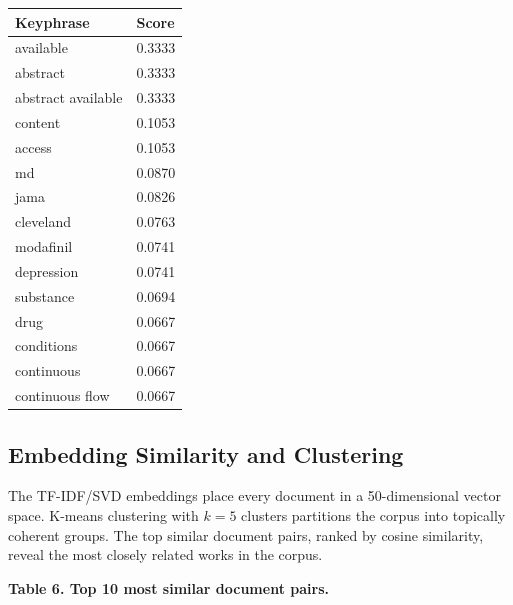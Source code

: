 \documentclass[
  english,
]{article}
\newcounter{none} %
\begin{document}
{\def\LTcaptype{none} %
\begin{longtable}[]{@{}ll@{}}
\toprule\noalign{}
Keyphrase & Score \\
\midrule\noalign{}
\endhead
\bottomrule\noalign{}
\endlastfoot
available & 0.3333 \\
abstract & 0.3333 \\
abstract available & 0.3333 \\
content & 0.1053 \\
access & 0.1053 \\
md & 0.0870 \\
jama & 0.0826 \\
cleveland & 0.0763 \\
modafinil & 0.0741 \\
depression & 0.0741 \\
substance & 0.0694 \\
drug & 0.0667 \\
conditions & 0.0667 \\
continuous & 0.0667 \\
continuous flow & 0.0667 \\
\end{longtable}
}

\subsection{Embedding Similarity and
Clustering}\label{embedding-similarity-and-clustering}

The TF-IDF/SVD embeddings place every document in a 50-dimensional
vector space. K-means clustering with \(k = 5\) clusters partitions the
corpus into topically coherent groups. The top similar document pairs,
ranked by cosine similarity, reveal the most closely related works in
the corpus.

\textbf{Table 6. Top 10 most similar document pairs.}
\end{document}
